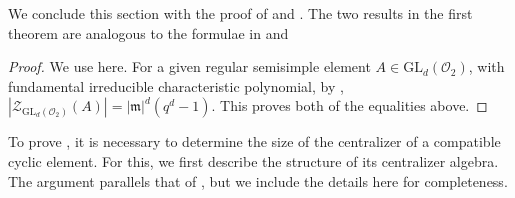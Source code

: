 \documentclass[11pt,twoside]{amsart}
\newcommand{\GL}{\mathrm{GL}}
\newcommand{\R}{\mathscr{O}_2}
\newcommand{\Zen}{\mathscr{Z}}
\theoremstyle{definition} %
\begin{document}
We conclude this section with the proof of  and .
The two results in the first theorem are analogous to the formulae in \cite[Section 2]{Wall1999Counting} and \cite[Theorem 5.3(1)]{KunduSinghGL}
\theoremthree*
\begin{proof}
    We use  here. 
    For a given regular semisimple element $A\in\GL_d(\R)$, with fundamental irreducible characteristic polynomial, by , $|\Zen_{\GL_d(\R)}(A)|=|\mathfrak{m}|^d(q^d-1)$.
    This proves both of the equalities above.
\end{proof}
To prove , it is necessary to determine the size of the centralizer of a compatible cyclic element.  
For this, we first describe the structure of its centralizer algebra.  
The argument parallels that of , but we include the details here for completeness.
\end{document}
